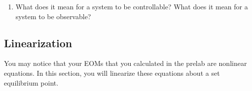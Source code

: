 \documentclass[12pt]{report}
\newcommand\drew[1]{\textcolor{red}{#1}}
\newcommand{\pder}[2]{\frac{\partial #1}{\partial #2}}
\begin{document}
\begin{enumerate}
    \item What does it mean for a system to be controllable? What does it mean for a system to be observable?\\
\end{enumerate}

\subsection{Linearization}\label{subsubsection:lab2_linearize}
You may notice that your EOMs that you calculated in the prelab are nonlinear equations. In this section, you will linearize these equations about a set equilibrium point.
\end{document}
